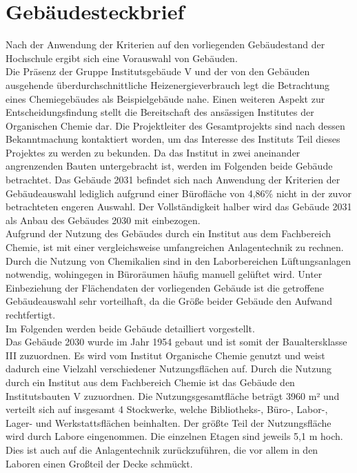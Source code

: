 \section{Gebäudesteckbrief}
\label{sec:Gebäudesteckbrief} 
Nach der Anwendung der Kriterien auf den vorliegenden Gebäudestand der Hochschule ergibt sich eine Vorauswahl von Gebäuden. \\ Die Präsenz der Gruppe Institutsgebäude V und der von den Gebäuden ausgehende überdurchschnittliche Heizenergieverbrauch legt die Betrachtung eines Chemiegebäudes als Beispielgebäude nahe. Einen weiteren Aspekt zur Entscheidungsfindung stellt die Bereitschaft des ansässigen Institutes der Organischen Chemie dar. Die Projektleiter des Gesamtprojekts sind nach dessen Bekanntmachung kontaktiert worden, um das Interesse des Instituts Teil dieses Projektes zu werden zu bekunden. Da das Institut in zwei aneinander angrenzenden Bauten untergebracht ist, werden im Folgenden beide Gebäude betrachtet. Das Gebäude 2031 befindet sich nach Anwendung der Kriterien der Gebäudeauswahl lediglich aufgrund einer Bürofläche von 4,86\% nicht in der zuvor betrachteten engeren Auswahl. Der Vollständigkeit halber wird das Gebäude 2031 als Anbau des Gebäudes 2030 mit einbezogen.
\\
Aufgrund der Nutzung des Gebäudes durch ein Institut aus dem Fachbereich Chemie, ist mit einer vergleichsweise umfangreichen Anlagentechnik zu rechnen. Durch die Nutzung von Chemikalien sind in den Laborbereichen Lüftungsanlagen notwendig, wohingegen in  Büroräumen häufig manuell gelüftet wird. 
Unter Einbeziehung der Flächendaten der vorliegenden Gebäude ist die getroffene Gebäudeauswahl sehr vorteilhaft, da die Größe beider Gebäude den Aufwand rechtfertigt. \\
Im Folgenden werden beide Gebäude detailliert vorgestellt.
\\
Das Gebäude 2030 wurde im Jahr 1954 gebaut und ist somit der Baualtersklasse III zuzuordnen. Es wird vom Institut Organische Chemie genutzt und weist dadurch eine Vielzahl verschiedener Nutzungsflächen auf. Durch die Nutzung durch ein Institut aus dem Fachbereich Chemie ist das Gebäude den Institutsbauten V zuzuordnen. Die Nutzungsgesamtfläche beträgt 3960 m² und verteilt sich auf insgesamt 4 Stockwerke, welche Bibliotheks-, Büro-, Labor-, Lager- und Werkstattsflächen beinhalten. Der größte Teil der Nutzungsfläche wird durch Labore eingenommen. Die einzelnen Etagen sind jeweils 5,1 m hoch. Dies ist auch auf die Anlagentechnik zurückzuführen, die vor allem in den Laboren einen Großteil der Decke schmückt. \\
